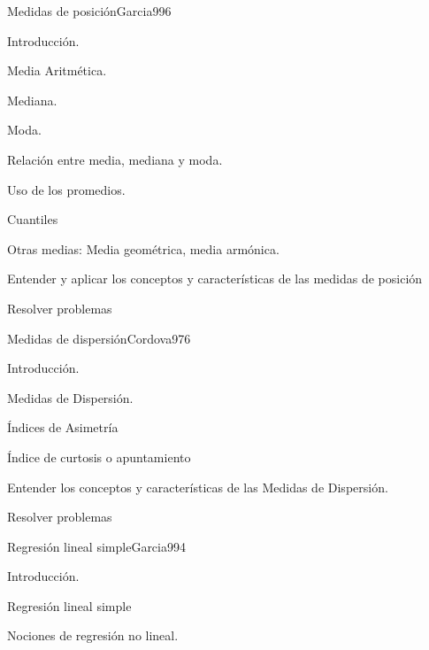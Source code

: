 \begin{sumilla}
\begin{unit}{Medidas de posici\'on}{Garcia99}{6}
   \begin{topicos}
	\item Introducci\'on.
	\item Media Aritm\'etica.
	\item Mediana.
	\item Moda.
	\item Relaci\'on entre media, mediana y moda.
	\item Uso de los promedios.
	\item Cuantiles
	\item Otras medias: Media geom\'etrica, media arm\'onica.
   \end{topicos}

   \begin{objetivos}
         \item  Entender y aplicar los conceptos y caracter\'isticas de las medidas de posici\'on
         \item  Resolver problemas
   \end{objetivos}
\end{unit}

\begin{unit}{Medidas de dispersi\'on}{Cordova97}{6}
   \begin{topicos}
         \item  Introducci\'on.
	 \item  Medidas de Dispersi\'on.
         \item  \'Indices de Asimetr\'ia
	 \item  \'Indice de curtosis o apuntamiento
   \end{topicos}

   \begin{objetivos}
         \item  Entender los conceptos y caracter\'isticas de las Medidas de Dispersi\'on.
         \item  Resolver problemas
   \end{objetivos}
\end{unit}

\begin{unit}{Regresi\'on lineal simple}{Garcia99}{4}
   \begin{topicos}
         \item  Introducci\'on.
	 \item  Regresi\'on lineal simple
         \item  Nociones de regresi\'on no lineal.
   \end{topicos}


\end{unit}
\end{sumilla}
